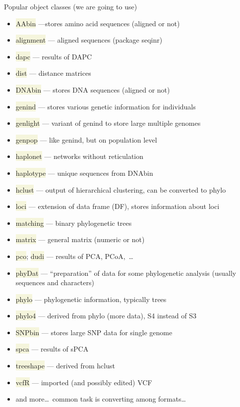 \documentclass[compress, xelatex, 11pt, xcolor=svgnames, aspectratio=169, url={hyphens, lowtilde}]{beamer}
\renewcommand{\texttt}[1]{\colorbox{Beige}{{\ttfamily #1}}}
\begin{document}
\begin{frame}[allowframebreaks]{Popular object classes (we are going to use)}
	\begin{itemize}
		\item \texttt{AAbin} ---stores amino acid sequences (aligned or not)
		\item \texttt{alignment} --- aligned sequences (package seqinr)
		\item \texttt{dapc} --- results of DAPC
		\item \texttt{dist} --- distance matrices
		\item \texttt{DNAbin} --- stores DNA sequences (aligned or not)
		\item \texttt{genind} --- stores various genetic information for individuals
		\item \texttt{genlight} --- variant of genind to store large multiple genomes
		\item \texttt{genpop} --- like genind, but on population level
		\item \texttt{haplonet} --- networks without reticulation
		\item \texttt{haplotype} --- unique sequences from DNAbin
		\item \texttt{hclust} --- output of hierarchical clustering, can be converted to phylo
		\item \texttt{loci} --- extension of data frame (DF), stores information about loci
		\item \texttt{matching} --- binary phylogenetic trees
		\item \texttt{matrix} --- general matrix (numeric or not)
		\item \texttt{pco}; \texttt{dudi} --- results of PCA, PCoA,~\ldots
		\item \texttt{phyDat} --- \enquote{preparation} of data for some phylogenetic analysis (usually sequences and characters)
		\item \texttt{phylo} --- phylogenetic information, typically trees
		\item \texttt{phylo4} --- derived from phylo (more data), S4 instead of S3
		\item \texttt{SNPbin} --- stores large SNP data for single genome
		\item \texttt{spca} --- results of sPCA
		\item \texttt{treeshape} --- derived from hclust
		\item \texttt{vcfR} --- imported (and possibly edited) VCF
		\item and more\ldots~common task is converting among formats\ldots

\end{itemize}
\end{frame}
\end{document}
